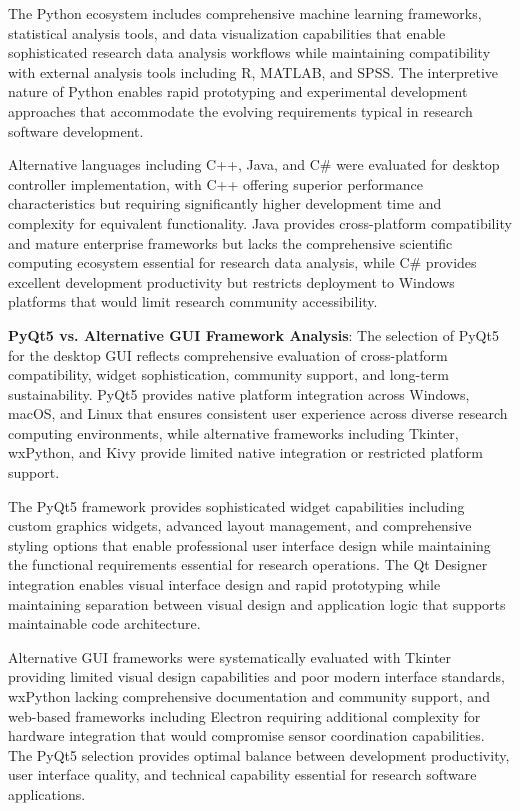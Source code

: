 \documentclass[12pt,a4paper]{report}
\begin{document}
The Python ecosystem includes comprehensive machine learning frameworks, statistical analysis tools, and data
visualization capabilities that enable sophisticated research data analysis workflows while maintaining compatibility
with external analysis tools including R, MATLAB, and SPSS. The interpretive nature of Python enables rapid prototyping
and experimental development approaches that accommodate the evolving requirements typical in research software
development.

Alternative languages including C++, Java, and C\# were evaluated for desktop controller implementation, with C++
offering superior performance characteristics but requiring significantly higher development time and complexity for
equivalent functionality. Java provides cross-platform compatibility and mature enterprise frameworks but lacks the
comprehensive scientific computing ecosystem essential for research data analysis, while C\# provides excellent
development productivity but restricts deployment to Windows platforms that would limit research community
accessibility.

\textbf{PyQt5 vs. Alternative GUI Framework Analysis}: The selection of PyQt5 for the desktop GUI reflects comprehensive
evaluation of cross-platform compatibility, widget sophistication, community support, and long-term sustainability.
PyQt5 provides native platform integration across Windows, macOS, and Linux that ensures consistent user experience
across diverse research computing environments, while alternative frameworks including Tkinter, wxPython, and Kivy
provide limited native integration or restricted platform support.

The PyQt5 framework provides sophisticated widget capabilities including custom graphics widgets, advanced layout
management, and comprehensive styling options that enable professional user interface design while maintaining the
functional requirements essential for research operations. The Qt Designer integration enables visual interface design
and rapid prototyping while maintaining separation between visual design and application logic that supports
maintainable code architecture.

Alternative GUI frameworks were systematically evaluated with Tkinter providing limited visual design capabilities and
poor modern interface standards, wxPython lacking comprehensive documentation and community support, and web-based
frameworks including Electron requiring additional complexity for hardware integration that would compromise sensor
coordination capabilities. The PyQt5 selection provides optimal balance between development productivity, user interface
quality, and technical capability essential for research software applications.
\end{document}
